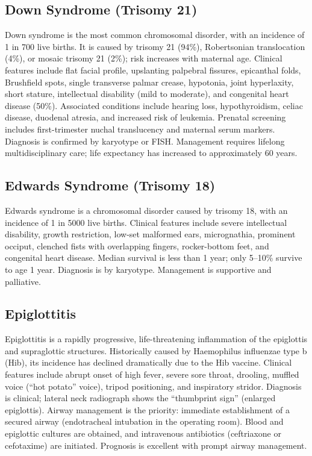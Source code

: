 \subsection{Down Syndrome (Trisomy 21)}
\label{sec:Down Syndrome}
Down syndrome is the most common chromosomal disorder, with an incidence of 1 in 700 live births. It is caused by trisomy 21 (94\%), Robertsonian translocation (4\%), or mosaic trisomy 21 (2\%); risk increases with maternal age. Clinical features include flat facial profile, upslanting palpebral fissures, epicanthal folds, Brushfield spots, single transverse palmar crease, hypotonia, joint hyperlaxity, short stature, intellectual disability (mild to moderate), and congenital heart disease (50\%). Associated conditions include hearing loss, hypothyroidism, celiac disease, duodenal atresia, and increased risk of leukemia. Prenatal screening includes first-trimester nuchal translucency and maternal serum markers. Diagnosis is confirmed by karyotype or FISH. Management requires lifelong multidisciplinary care; life expectancy has increased to approximately 60 years.

\subsection{Edwards Syndrome (Trisomy 18)}
\label{sec:Edwards Syndrome}
Edwards syndrome is a chromosomal disorder caused by trisomy 18, with an incidence of 1 in 5000 live births. Clinical features include severe intellectual disability, growth restriction, low-set malformed ears, micrognathia, prominent occiput, clenched fists with overlapping fingers, rocker-bottom feet, and congenital heart disease. Median survival is less than 1 year; only 5--10\% survive to age 1 year. Diagnosis is by karyotype. Management is supportive and palliative.

\subsection{Epiglottitis}
\label{sec:Epiglottitis}
Epiglottitis is a rapidly progressive, life-threatening inflammation of the epiglottis and supraglottic structures. Historically caused by Haemophilus influenzae type b (Hib), its incidence has declined dramatically due to the Hib vaccine. Clinical features include abrupt onset of high fever, severe sore throat, drooling, muffled voice (``hot potato'' voice), tripod positioning, and inspiratory stridor. Diagnosis is clinical; lateral neck radiograph shows the ``thumbprint sign'' (enlarged epiglottis). Airway management is the priority: immediate establishment of a secured airway (endotracheal intubation in the operating room). Blood and epiglottic cultures are obtained, and intravenous antibiotics (ceftriaxone or cefotaxime) are initiated. Prognosis is excellent with prompt airway management.


